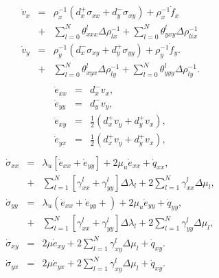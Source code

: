 \documentclass[11pt]{article}
\begin{document}
\begin{eqnarray}
  \dot{v}_x & = & \rho^{-1}_x\left(d^+_x \sigma_{xx} +d^-_y \sigma_{xy}\right) 
             +   \rho^{-1}_x \dot{f}_x                             \nonumber\\ 
            & + & \sum_{l=0}^N\theta^l_{xxx}\Delta\rho^{-1}_{lx}
             +  \sum_{l=0}^N\theta^l_{yxy}\Delta\rho^{-1}_{lix}      \nonumber\\
  \dot{v}_y & = & \rho^{-1}_y\left(d^-_x \sigma_{xy} +d^+_y \sigma_{yy}\right) 
             +   \rho^{-1}_y \dot{f}_y.                            \nonumber\\
            & + & \sum_{l=0}^N\theta^l_{xyx}\Delta\rho^{-1}_{ly}
           +  \sum_{l=0}^N\theta^l_{yyy}\Delta\rho^{-1}_{ly}.        \nonumber \\
\end{eqnarray}
\begin{eqnarray}
    \dot{e}_{xx} & = & d^-_x v_x, \nonumber \\
    \dot{e}_{yy} & = & d^-_y v_y, \nonumber \\
    \dot{e}_{xy} & = & \frac{1}{2}(d^+_x v_y + d^+_y v_x),\nonumber\\
                \label{eq:strains}
    \dot{e}_{yx} & = & \frac{1}{2}(d^+_x v_y + d^+_y v_x),\nonumber\\
                \label{eq:strains}
\end{eqnarray}
\begin{eqnarray}
  \dot{\sigma}_{xx} 
     & = & \lambda_u \left [\dot{e}_{xx} 
                 + \dot{e}_{yy} \right]
                 + 2\mu_u \dot{e}_{xx} +\dot{q}_{xx},           \nonumber\\ 
    & + & \sum_{l=1}^N\left[\gamma^l_{xx}
                           +\gamma^l_{yy}\right]\Delta\lambda_l
         + 2\sum_{l=1}^N\gamma^l_{xx}\Delta\mu_l,                \nonumber\\
  \dot{\sigma}_{yy} 
     & = & \lambda_u \left (\dot{e}_{xx} 
                 +\dot{e}_{yy} + \right)
                 + 2\mu_u \dot{e}_{yy} +\dot{q}_{yy},           \nonumber\\
    & + & \sum_{l=1}^N\left[\gamma^l_{xx}
                           +\gamma^l_{yy}\right]\Delta\lambda_l
         + 2\sum_{l=1}^N\gamma^l_{yy}\Delta\mu_l,                \nonumber\\
  \dot{\sigma}_{xy} 
  &  = &   2\mu \dot{e}_{xy} + 2\sum_{l=1}^N\gamma^l_{xy}
          \Delta\mu_l+\dot{q}_{xy}.                              \nonumber\\
  \dot{\sigma}_{yx} 
  &  = &   2\mu \dot{e}_{yx} + 2\sum_{l=1}^N\gamma^l_{xy}
          \Delta\mu_l+\dot{q}_{xy}.                              \nonumber\\
\end{eqnarray}
\end{document}
